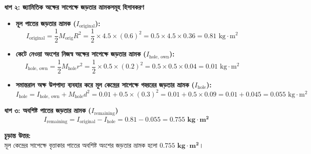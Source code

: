 \documentclass[12pt, a4paper]{article}
\begin{document}
\begin{tcolorbox}[solutionbox={সমাধান (Solution)}]
\begin{center}
\begin{tikzpicture}[>=Stealth, scale=1.1, text=black]
\end{tikzpicture}
\end{center}
\vspace{1em}

\vspace{0.5em}
\noindent
\textbf{ধাপ ২: জ্যামিতিক অক্ষের সাপেক্ষে জড়তার ভ্রামকসমূহ হিসাবকরণ} \\
\begin{itemize}[leftmargin=*, parsep=0.4ex]
    \item \textbf{মূল পাতের জড়তার ভ্রামক ($I_{\text{original}}$):}
    $$I_{\text{original}} = \frac{1}{2} M_{\text{orig}} R^2 = \frac{1}{2} \times 4.5 \times (0.6)^2 = 0.5 \times 4.5 \times 0.36 = 0.81\text{ kg}\cdot\text{m}^2$$
    \item \textbf{কেটে নেওয়া অংশের নিজস্ব অক্ষের সাপেক্ষে জড়তার ভ্রামক ($I_{\text{hole, own}}$):}
    $$I_{\text{hole, own}} = \frac{1}{2} M_{\text{hole}} r^2 = \frac{1}{2} \times 0.5 \times (0.2)^2 = 0.5 \times 0.5 \times 0.04 = 0.01\text{ kg}\cdot\text{m}^2$$
    \item \textbf{সমান্তরাল অক্ষ উপপাদ্য ব্যবহার করে মূল কেন্দ্রের সাপেক্ষে গহ্বরের জড়তার ভ্রামক ($I_{\text{hole}}$):}
    $$I_{\text{hole}} = I_{\text{hole, own}} + M_{\text{hole}} d^2 = 0.01 + 0.5 \times (0.3)^2 = 0.01 + 0.5 \times 0.09 = 0.01 + 0.045 = 0.055\text{ kg}\cdot\text{m}^2$$
\end{itemize}

\vspace{0.5em}
\noindent
\textbf{ধাপ ৩: অবশিষ্ট পাতের জড়তার ভ্রামক ($I_{\text{remaining}}$)} \\
$$I_{\text{remaining}} = I_{\text{original}} - I_{\text{hole}} = 0.81 - 0.055 = \mathbf{0.755\text{ kg}\cdot\text{m}^2}$$

\vspace{1em}
\begin{tcolorbox}[answerbox]
\textbf{চূড়ান্ত উত্তর:} \\
মূল কেন্দ্রের সাপেক্ষে বৃত্তাকার পাতের অবশিষ্ট অংশের জড়তার ভ্রামক হলো $\mathbf{0.755\text{ kg}\cdot\text{m}^2}$।
\end{tcolorbox}
\end{tcolorbox}
\end{document}
